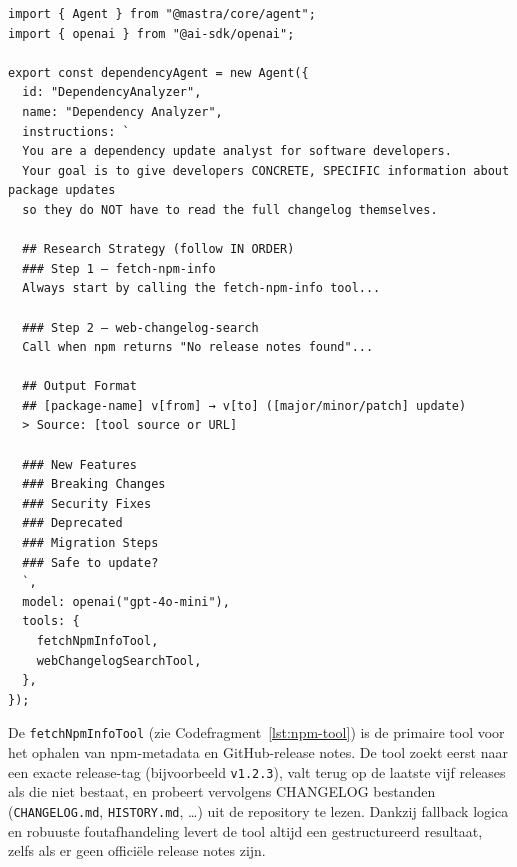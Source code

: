 \begin{listing}[H]
\begin{verbatim}
import { Agent } from "@mastra/core/agent";
import { openai } from "@ai-sdk/openai";

export const dependencyAgent = new Agent({
  id: "DependencyAnalyzer",
  name: "Dependency Analyzer",
  instructions: `
  You are a dependency update analyst for software developers.
  Your goal is to give developers CONCRETE, SPECIFIC information about package updates
  so they do NOT have to read the full changelog themselves.

  ## Research Strategy (follow IN ORDER)
  ### Step 1 — fetch-npm-info
  Always start by calling the fetch-npm-info tool...

  ### Step 2 — web-changelog-search
  Call when npm returns "No release notes found"...

  ## Output Format
  ## [package-name] v[from] → v[to] ([major/minor/patch] update)
  > Source: [tool source or URL]

  ### New Features
  ### Breaking Changes  
  ### Security Fixes
  ### Deprecated
  ### Migration Steps
  ### Safe to update?
  `,
  model: openai("gpt-4o-mini"),
  tools: {
    fetchNpmInfoTool,
    webChangelogSearchTool,
  },
});
\end{verbatim}
\caption{Configuratie van de \texttt{dependencyAgent} met de nodige tools voor de gekozen research strategie}
\label{lst:mastra-agent-config}
\end{listing}

De \texttt{fetchNpmInfoTool} (zie Codefragment~\ref{lst:npm-tool}) is de primaire tool voor het ophalen van npm-metadata en GitHub-release notes. De tool zoekt eerst naar een exacte release-tag (bijvoorbeeld \texttt{v1.2.3}), valt terug op de laatste vijf releases als die niet bestaat, en probeert vervolgens CHANGELOG bestanden (\texttt{CHANGELOG.md}, \texttt{HISTORY.md}, …) uit de repository te lezen. Dankzij fallback logica en robuuste foutafhandeling levert de tool altijd een gestructureerd resultaat, zelfs als er geen officiële release notes zijn.

